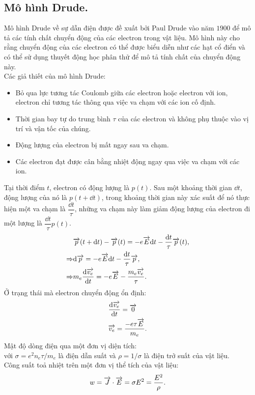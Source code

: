 \begin{appendices}
\subsection{Mô hình Drude.}
    Mô hình Drude về sự dẫn điện được đề xuất bởi Paul Drude vào năm $1900$ để mô tả các tính chất chuyển động của các electron trong vật liệu. Mô hình này cho rằng chuyển động của các electron có thể được biểu diễn như các hạt cổ điển và có thể sử dụng thuyết động học phân thử để mô tả tính chất của chuyển động này.\\
    Các giả thiết của mô hình Drude:
    \begin{itemize}
        \item Bỏ qua lực tương tác Coulomb giữa các electron hoặc electron với ion, electron chỉ tương tác thông qua việc va chạm với các ion cố định.
        \item Thời gian bay tự do trung bình $\tau$ của các electron và không phụ thuộc vào vị trí và vận tốc của chúng.
        \item Động lượng của electron bị mất ngay sau va chạm.
        \item Các electron đạt được cân bằng nhiệt động ngay qua việc va chạm với các ion.
    \end{itemize}
    Tại thời điểm $t$, electron có động lượng là $p(t)$. Sau một khoảng thời gian $\dd t$, động lượng của nó là $p(t+\dd t)$, trong khoảng thời gian này xác suất để nó thực hiện một va chạm là $\dfrac{\dd t}{\tau}$, những va chạm này làm giảm động lượng của electron đi một lượng là $\dfrac{\dd t}{\tau}p(t)$. 
    \begin{align*}
        &\overrightarrow{p}(t+\mathrm{d} t)-\overrightarrow{p}(t)= -e\overrightarrow{E}\mathrm{d} t-\dfrac{\mathrm{d} t}{\tau}\overrightarrow{p}(t),\\
        \Rightarrow &\mathrm{d}\overrightarrow{p}=-e\overrightarrow{E}\mathrm{d} t-\dfrac{\mathrm{d} t}{\tau}\overrightarrow{p},\\
        \Rightarrow &m_e\dfrac{\mathrm{d}\overrightarrow{v_e}}{\mathrm{d} t}=-e\overrightarrow{E}-\dfrac{m_e\overrightarrow{v_e}}{\tau}.
    \end{align*}
    Ở trạng thái mà electron chuyển động ổn định: 
    \begin{align*}
        &\dfrac{\mathrm{d}\overrightarrow{v_e}}{\mathrm{d} t}=\overrightarrow{0}\\
        &\overrightarrow{v_e}=\dfrac{-e\tau\overrightarrow{E}}{m_e}.
    \end{align*}
    Mật độ dòng điện qua một đơn vị diện tích:\\
    với $\sigma=e^2n_e\tau/m_e$ là điện dẫn suất và $\rho=1/\sigma$ là điện trở suất của vật liệu.\\
    Công suất toả nhiệt trên một đơn vị thể tích của vật liệu:
    $$w=\overrightarrow{J}\cdot\overrightarrow{E}=\sigma E^2=\dfrac{E^2}{\rho}.$$

\end{appendices}
